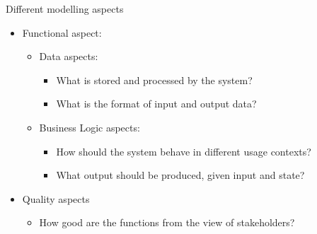 
\begin{Slide}{Different modelling aspects }


\begin{itemize}
\item Functional aspect:
\begin{itemize}
\item Data aspects:
\begin{itemize}
\item What is stored and processed by the system?
\item What is the format of input and output data?

\end{itemize}
\item Business Logic aspects: 
\begin{itemize}
\item How should the system behave in different usage contexts?
\item What output should be produced, given input and state?  

\end{itemize}
\end{itemize}
\item Quality aspects
\begin{itemize}
\item How good are the functions from the view of stakeholders?

\end{itemize}
\end{itemize}
\end{Slide}